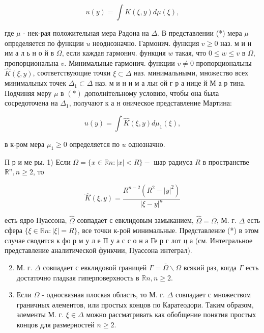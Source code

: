 \documentclass[10pt]{article}
\begin{document}
\[

u(y)=\int K(\xi, y) d \mu(\xi),

\]



где $\mu$ - нек-рая положительная мера Радона на $\Delta$. В представлении (*) мера $\mu$ определяется по функции $u$ неоднозначно. Гармонич. функция $v \geqslant 0$ наз. м и н им а л ь н о й в $\Omega$, если каждая гармонич. функция $w$ такая, что $0 \leqslant w \leqslant v$ в $\Omega$, пропорциональна $v$. Минимальные гармонич. функции $v \neq 0$ пропорциональны $\widehat{K}(\xi, y)$, соответствующие точки $\xi \subset \Delta$ наз. минимальными, множество всех минимальных точек $\Delta_{1} \subset \Delta$ наз. м и н и м а льн ой г р а нице й М а р тина. Подчиняя меру $\mu$ в $(*)$ дополнітельному условию, чтобы она была сосредоточена на $\Delta_{1}$, получают к а н оническое представление Мартина:



\[

u(y)=\int \hat{K}(\xi, y) d \mu_{1}(\xi),

\]



в к-ром мера $\mu_{1} \geqslant 0$ определяется по $u$ однозначно.



П р и ме ры. 1) Если $\Omega=\{x \in \mathbb{R} n:|x|<R\}-$ шар радиуса $R$ в пространстве $\mathbb{R}^{n}, n \geqslant 2$, то



\[

\widehat{K}(\xi, y)=\frac{R^{n-2}\left(R^{2}-|y|^{2}\right)}{|\xi-y|^{n}}

\]



есть ядро Пуассона, $\widehat{\Omega}$ совпадает с евклидовым замыканием, $\hat{\Omega}=\bar{\Omega}$, М. г. $\Delta$ есть сфера $\{\xi \in \mathbb{R} n:|\xi|=R\}$, все точки к-рой минимальные. Представление (*) в этом случае сводится к фо р м у л е П у а с с о н а Ге р г лот ц а (см. Интегральное представление аналитической функчии, Пуассона интеграл).



\begin{enumerate}

  \setcounter{enumi}{1}

  \item М. г. $\Delta$ совпадает с евклидовой границей $\Gamma=\bar{\Omega} \backslash \Omega$ всякий раз, когда $\Gamma$ есть достаточно гладкая гиперповерхность в $\mathbb{R} n, n \geqslant 2$.



  \item Если $\Omega$ - односвязная плоская область, то М. г. $\Delta$ совпадает с множеством граничных әлементов, или простых концов по Каратеодори. Таким образом, элементы М. г. $\xi \in \Delta$ можно рассматривать как обобщение понятия простых концов для размерностей $n \geqslant 2$.



\end{enumerate}
\end{document}
